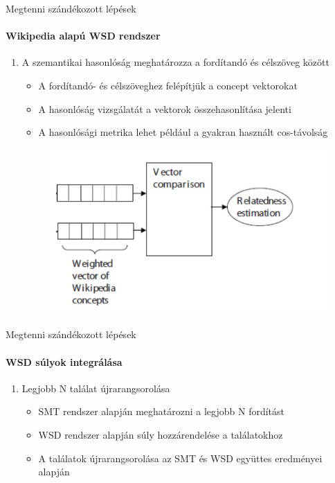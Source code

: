 \begin{frame}{Megtenni szándékozott lépések}
\framesubtitle{Wikipedia alapú WSD rendszer}

	\begin{enumerate}
		\restorecounter	
	
		\item A szemantikai hasonlóság meghatározza a fordítandó és célszöveg között
		\begin{itemize}
			\item A fordítandó- és célszöveghez felépítjük a concept vektorokat
			\item A hasonlóság vizsgálatát a vektorok összehasonlítása jelenti
			\item A hasonlósági metrika lehet például a gyakran használt cos-távolság
		\end{itemize}
	
		\begin{figure}[t]
			\includegraphics[scale=0.4]{images/similarity}
 		\end{figure}	
	
		\savecounter
	\end{enumerate}

\end{frame}

\begin{frame}{Megtenni szándékozott lépések}
\framesubtitle{WSD súlyok integrálása}	
	
	\begin{enumerate}
		\restorecounter
						
		\item Legjobb N találat újrarangsorolása
		\begin{itemize}
			\item SMT rendszer alapján meghatározni a legjobb N fordítást
			\item WSD rendszer alapján súly hozzárendelése a találatokhoz
			\item A találatok újrarangsorolása az SMT és WSD együttes eredményei alapján
		\end{itemize}
	\end{enumerate}
	
\end{frame}